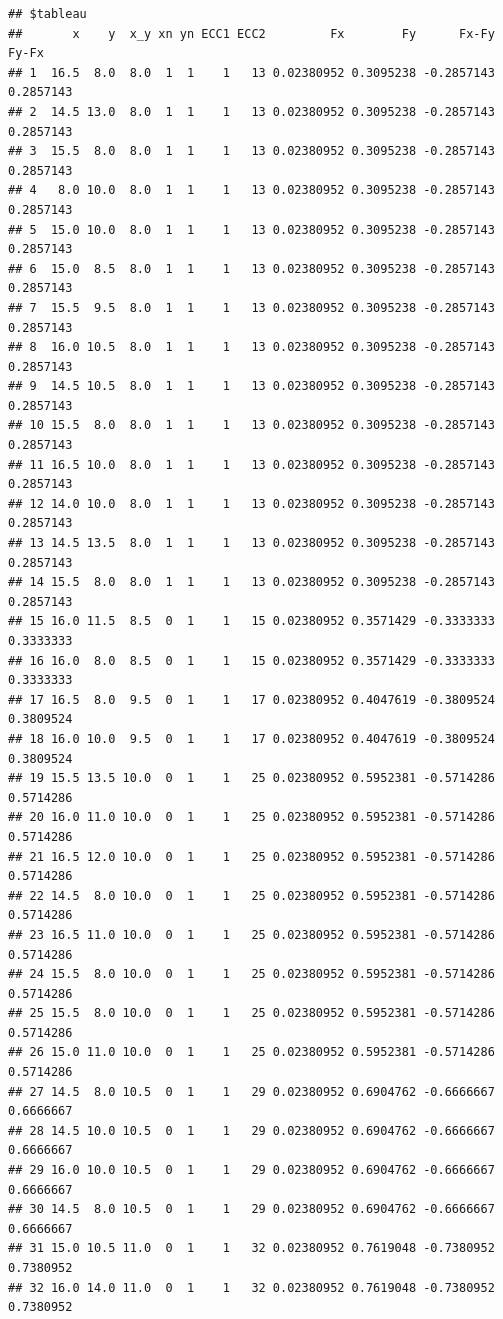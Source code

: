 \documentclass[
  12pt,
]{article}
\begin{document}
\begin{verbatim}
## $tableau
##       x    y  x_y xn yn ECC1 ECC2         Fx        Fy      Fx-Fy     Fy-Fx
## 1  16.5  8.0  8.0  1  1    1   13 0.02380952 0.3095238 -0.2857143 0.2857143
## 2  14.5 13.0  8.0  1  1    1   13 0.02380952 0.3095238 -0.2857143 0.2857143
## 3  15.5  8.0  8.0  1  1    1   13 0.02380952 0.3095238 -0.2857143 0.2857143
## 4   8.0 10.0  8.0  1  1    1   13 0.02380952 0.3095238 -0.2857143 0.2857143
## 5  15.0 10.0  8.0  1  1    1   13 0.02380952 0.3095238 -0.2857143 0.2857143
## 6  15.0  8.5  8.0  1  1    1   13 0.02380952 0.3095238 -0.2857143 0.2857143
## 7  15.5  9.5  8.0  1  1    1   13 0.02380952 0.3095238 -0.2857143 0.2857143
## 8  16.0 10.5  8.0  1  1    1   13 0.02380952 0.3095238 -0.2857143 0.2857143
## 9  14.5 10.5  8.0  1  1    1   13 0.02380952 0.3095238 -0.2857143 0.2857143
## 10 15.5  8.0  8.0  1  1    1   13 0.02380952 0.3095238 -0.2857143 0.2857143
## 11 16.5 10.0  8.0  1  1    1   13 0.02380952 0.3095238 -0.2857143 0.2857143
## 12 14.0 10.0  8.0  1  1    1   13 0.02380952 0.3095238 -0.2857143 0.2857143
## 13 14.5 13.5  8.0  1  1    1   13 0.02380952 0.3095238 -0.2857143 0.2857143
## 14 15.5  8.0  8.0  1  1    1   13 0.02380952 0.3095238 -0.2857143 0.2857143
## 15 16.0 11.5  8.5  0  1    1   15 0.02380952 0.3571429 -0.3333333 0.3333333
## 16 16.0  8.0  8.5  0  1    1   15 0.02380952 0.3571429 -0.3333333 0.3333333
## 17 16.5  8.0  9.5  0  1    1   17 0.02380952 0.4047619 -0.3809524 0.3809524
## 18 16.0 10.0  9.5  0  1    1   17 0.02380952 0.4047619 -0.3809524 0.3809524
## 19 15.5 13.5 10.0  0  1    1   25 0.02380952 0.5952381 -0.5714286 0.5714286
## 20 16.0 11.0 10.0  0  1    1   25 0.02380952 0.5952381 -0.5714286 0.5714286
## 21 16.5 12.0 10.0  0  1    1   25 0.02380952 0.5952381 -0.5714286 0.5714286
## 22 14.5  8.0 10.0  0  1    1   25 0.02380952 0.5952381 -0.5714286 0.5714286
## 23 16.5 11.0 10.0  0  1    1   25 0.02380952 0.5952381 -0.5714286 0.5714286
## 24 15.5  8.0 10.0  0  1    1   25 0.02380952 0.5952381 -0.5714286 0.5714286
## 25 15.5  8.0 10.0  0  1    1   25 0.02380952 0.5952381 -0.5714286 0.5714286
## 26 15.0 11.0 10.0  0  1    1   25 0.02380952 0.5952381 -0.5714286 0.5714286
## 27 14.5  8.0 10.5  0  1    1   29 0.02380952 0.6904762 -0.6666667 0.6666667
## 28 14.5 10.0 10.5  0  1    1   29 0.02380952 0.6904762 -0.6666667 0.6666667
## 29 16.0 10.0 10.5  0  1    1   29 0.02380952 0.6904762 -0.6666667 0.6666667
## 30 14.5  8.0 10.5  0  1    1   29 0.02380952 0.6904762 -0.6666667 0.6666667
## 31 15.0 10.5 11.0  0  1    1   32 0.02380952 0.7619048 -0.7380952 0.7380952
## 32 16.0 14.0 11.0  0  1    1   32 0.02380952 0.7619048 -0.7380952 0.7380952

\end{verbatim}
\end{document}
